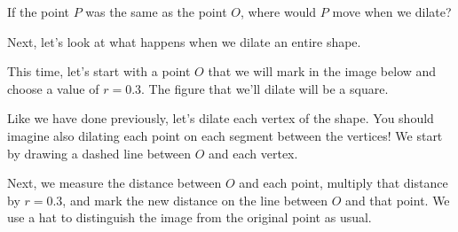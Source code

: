 \documentclass{ximera}
\begin{document}
\begin{question}
If the point $P$ was the same as the point $O$, where would $P$ move when we dilate?
\begin{multipleChoice}
\end{multipleChoice}
\end{question}

Next, let's look at what happens when we dilate an entire shape.

\begin{example}
This time, let's start with a point $O$ that we will mark in the image below and choose a value of $r=0.3$. The figure that we'll dilate will be a square. 
\begin{center}
\end{center}
Like we have done previously, let's dilate each vertex of the shape. You should imagine also dilating each point on each segment between the vertices! We start by drawing a dashed line between $O$ and each vertex.
\begin{center}
\end{center}
Next, we measure the distance between $O$ and each point, multiply that distance by $r=0.3$, and mark the new distance on the line between $O$ and that point. We use a hat to distinguish the image from the original point as usual.
\begin{center}
\begin{tikzpicture}

\end{tikzpicture}
\end{center}
\end{example}
\end{document}
